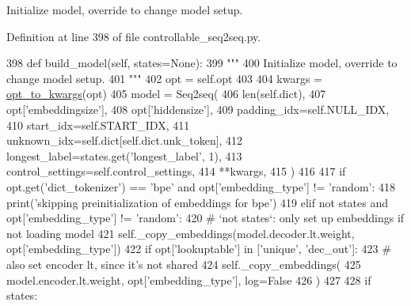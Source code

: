 \begin{DoxyVerb}Initialize model, override to change model setup.
\end{DoxyVerb}
 

Definition at line 398 of file controllable\+\_\+seq2seq.\+py.


\begin{DoxyCode}
398     \textcolor{keyword}{def }build\_model(self, states=None):
399         \textcolor{stringliteral}{"""}
400 \textcolor{stringliteral}{        Initialize model, override to change model setup.}
401 \textcolor{stringliteral}{        """}
402         opt = self.opt
403 
404         kwargs = \hyperlink{namespaceparlai_1_1agents_1_1legacy__agents_1_1seq2seq_1_1modules__v1_af13e3733abb5828b0c0a75d95833441c}{opt\_to\_kwargs}(opt)
405         model = Seq2seq(
406             len(self.dict),
407             opt[\textcolor{stringliteral}{'embeddingsize'}],
408             opt[\textcolor{stringliteral}{'hiddensize'}],
409             padding\_idx=self.NULL\_IDX,
410             start\_idx=self.START\_IDX,
411             unknown\_idx=self.dict[self.dict.unk\_token],
412             longest\_label=states.get(\textcolor{stringliteral}{'longest\_label'}, 1),
413             control\_settings=self.control\_settings,
414             **kwargs,
415         )
416 
417         \textcolor{keywordflow}{if} opt.get(\textcolor{stringliteral}{'dict\_tokenizer'}) == \textcolor{stringliteral}{'bpe'} \textcolor{keywordflow}{and} opt[\textcolor{stringliteral}{'embedding\_type'}] != \textcolor{stringliteral}{'random'}:
418             print(\textcolor{stringliteral}{'skipping preinitialization of embeddings for bpe'})
419         \textcolor{keywordflow}{elif} \textcolor{keywordflow}{not} states \textcolor{keywordflow}{and} opt[\textcolor{stringliteral}{'embedding\_type'}] != \textcolor{stringliteral}{'random'}:
420             \textcolor{comment}{# `not states`: only set up embeddings if not loading model}
421             self.\_copy\_embeddings(model.decoder.lt.weight, opt[\textcolor{stringliteral}{'embedding\_type'}])
422             \textcolor{keywordflow}{if} opt[\textcolor{stringliteral}{'lookuptable'}] \textcolor{keywordflow}{in} [\textcolor{stringliteral}{'unique'}, \textcolor{stringliteral}{'dec\_out'}]:
423                 \textcolor{comment}{# also set encoder lt, since it's not shared}
424                 self.\_copy\_embeddings(
425                     model.encoder.lt.weight, opt[\textcolor{stringliteral}{'embedding\_type'}], log=\textcolor{keyword}{False}
426                 )
427 
428         \textcolor{keywordflow}{if} states:

\end{DoxyCode}
